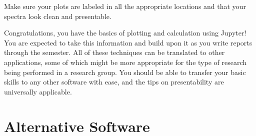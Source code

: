 \documentclass[nobib,nofonts,nols,nohyper]{tufte-handout}
\begin{document}
Make sure your plots are labeled in all the appropriate locations and that your spectra look clean and presentable.

Congratulations, you have the basics of plotting and calculation using Jupyter!
You are expected to take this information and build upon it as you write reports through the semester.
All of these techniques can be translated to other applications, some of which might be more appropriate for the type of research being performed in a research group.
You should be able to transfer your basic skills to any other software with ease, and the tips on presentability are universally applicable.


\section{Alternative Software} %
\label{alternative-software}
\end{document}

